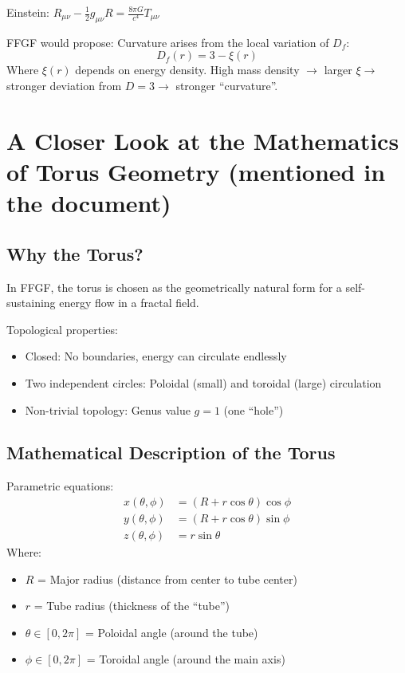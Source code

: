 	Einstein: \( R_{\mu\nu} - \frac{1}{2}g_{\mu\nu}R = \frac{8\pi G}{c^4} T_{\mu\nu} \)
	
	FFGF would propose: Curvature arises from the local variation of \( D_f \):
	\[
	D_f(r) = 3 - \xi(r)
	\]
	Where \( \xi(r) \) depends on energy density. High mass density \( \rightarrow \) larger \( \xi \rightarrow \) stronger deviation from \( D=3 \rightarrow \) stronger ``curvature''.
	\section{A Closer Look at the Mathematics of Torus Geometry (mentioned in the document)}
\subsection{Why the Torus?}
In FFGF, the torus is chosen as the geometrically natural form for a self-sustaining energy flow in a fractal field.

Topological properties:
\begin{itemize}
	\item Closed: No boundaries, energy can circulate endlessly
	\item Two independent circles: Poloidal (small) and toroidal (large) circulation
	\item Non-trivial topology: Genus value \( g = 1 \) (one ``hole'')
\end{itemize}

\subsection{Mathematical Description of the Torus}
Parametric equations:
\begin{align}
	x(\theta, \phi) &= (R + r \cos \theta) \cos \phi \\
	y(\theta, \phi) &= (R + r \cos \theta) \sin \phi \\
	z(\theta, \phi) &= r \sin \theta
\end{align}
Where:
\begin{itemize}
	\item \( R \) = Major radius (distance from center to tube center)
	\item \( r \) = Tube radius (thickness of the ``tube'')
	\item \( \theta \in [0, 2\pi] \) = Poloidal angle (around the tube)
	\item \( \phi \in [0, 2\pi] \) = Toroidal angle (around the main axis)
\end{itemize}

